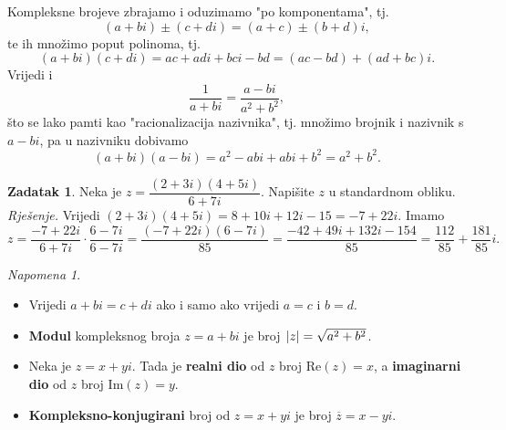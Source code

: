 \documentclass{book}
\theoremstyle{definition}
\theoremstyle{definition}
\newtheorem{exercise}{Zadatak}
\theoremstyle{remark}
\newtheorem{remark}{Napomena}
\begin{document}
\noindent Kompleksne brojeve zbrajamo i oduzimamo "po komponentama", tj. $$(a+bi)\pm (c+di)=(a+c)\pm (b+d)i,$$ te ih množimo poput polinoma, tj. $$(a+bi)(c+di)=ac+adi+bci-bd=(ac-bd)+(ad+bc)i.$$ Vrijedi i $$\dfrac{1}{a+bi}=\dfrac{a-bi}{a^2+b^2},$$ što se lako pamti kao "racionalizacija nazivnika", tj. množimo brojnik i nazivnik s $a-bi$, pa u nazivniku dobivamo $$(a+bi)(a-bi)=a^2-abi+abi+b^2=a^2+b^2.$$
\begin{exercise}
Neka je $z=\dfrac{(2+3i)(4+5i)}{6+7i}$. Napišite $z$ u standardnom obliku.\\
\textit{Rješenje.} Vrijedi $(2+3i)(4+5i)=8+10i+12i-15=-7+22i$. Imamo
$$z=\dfrac{-7+22i}{6+7i}\cdot \dfrac{6-7i}{6-7i}=\dfrac{(-7+22i)(6-7i)}{85}=\dfrac{-42+49i+132i-154}{85}=\dfrac{112}{85}+\dfrac{181}{85}i.$$
\end{exercise}
\begin{remark} \textbf{}
\label{18}
\begin{itemize}
\item Vrijedi $a+bi=c+di$ ako i samo ako vrijedi $a=c$ i $b=d$.
\item \textbf{Modul} kompleksnog broja $z=a+bi$ je broj $\;\abs{z}=\sqrt{a^2+b^2}$.
\item Neka je $z=x+yi$. Tada je \textbf{realni dio} od $z$ broj $\mathrm{Re}(z)=x$, a \textbf{imaginarni dio} od $z$ broj $\mathrm{Im}(z)=y$.
\item \textbf{Kompleksno-konjugirani} broj od $z=x+yi$ je broj $\overline{z}=x-yi$.
\end{itemize}
\end{remark}
\end{document}
